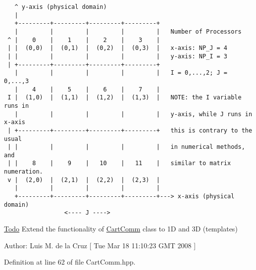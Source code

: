 \footnotesize\begin{verbatim}
   ^ y-axis (physical domain)
   |
   +---------+---------+---------+---------+
   |         |         |         |         |   Number of Processors
 ^ |    0    |    1    |    2    |    3    |   
 | |  (0,0)  |  (0,1)  |  (0,2)  |  (0,3)  |   x-axis: NP_J = 4
 | |         |         |         |         |   y-axis: NP_I = 3
 | +---------+---------+---------+---------+   
   |         |         |         |         |   I = 0,...,2; J = 0,...,3
   |    4    |    5    |    6    |    7    |   
 I |  (1,0)  |  (1,1)  |  (1,2)  |  (1,3)  |   NOTE: the I variable runs in
   |         |         |         |         |   y-axis, while J runs in x-axis
 | +---------+---------+---------+---------+   this is contrary to the usual
 | |         |         |         |         |   in numerical methods, and
 | |    8    |    9    |   10    |   11    |   similar to matrix numeration.
 v |  (2,0)  |  (2,1)  |  (2,2)  |  (2,3)  |   
   |         |         |         |         |   
   +---------+---------+---------+---------+---> x-axis (physical domain)
                 <---- J ---->
   \end{verbatim}
\normalsize
 \begin{Desc}
\item[\hyperlink{todo__todo000001}{Todo}]Extend the functionality of \hyperlink{classCartComm}{CartComm} class to 1D and 3D (templates)\end{Desc}
\begin{Desc}
\item[Author:]Luis M. de la Cruz \mbox{[} Tue Mar 18 11:10:23 GMT 2008 \mbox{]} \end{Desc}


Definition at line 62 of file CartComm.hpp.